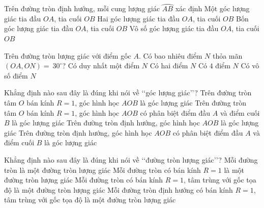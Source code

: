 \begin{ex}%
	Trên đường tròn định hướng, mỗi cung lượng giác  $\wideparen{AB}$ xác định
	\choice 
		{  Một góc lượng giác tia đầu $OA$, tia cuối $OB$}
		{ Hai góc lượng giác tia  đầu $OA$, tia cuối $OB$}
		{ Bốn góc lượng  giác tia đầu $OA$, tia cuối $OB$}
		{\True Vô số góc lượng  giác tia đầu $OA$, tia cuối $OB$}
\end{ex}

\begin{ex}%
	Trên đường tròn lượng giác với điểm gốc $A$. Có bao nhiêu điểm $N$ thỏa mãn $\left(OA, ON\right)=~30^\circ$? 
	 \choice
		{\True Có  duy nhất một điểm $N$}
		{Có hai  điểm $N$}
		{Có $4$ điểm $N$} 
		{Có vô  số điểm $N$}
\end{ex}

\begin{ex}%
	Khẳng định nào sau đây  là đúng khi nói về \lq\lq góc lượng giác\rq\rq?
	\choice 
		{  Trên đường tròn tâm $O$ bán kính $R=1$, góc hình học $AOB$ là góc lượng giác}
		{ Trên đường tròn tâm $O$ bán kính $R=1$, góc hình học $AOB$ có  phân biệt điểm đầu $A$ và điểm cuối $B$ là góc lượng giác}
		{ Trên đường tròn định hướng, góc hình học $AOB$ là góc lượng  giác}
		{\True Trên đường tròn định hướng, góc hình học  $AOB$ có phân biệt điểm đầu $A$ và điểm cuối $B$ là góc lượng giác}
\end{ex}

\begin{ex}%
	Khẳng định nào sau đây là đúng khi  nói về \lq\lq đường tròn lượng giác\rq\rq?
	 \choice
		{ Mỗi đường tròn là một đường tròn lượng  giác}
		{ Mỗi đường tròn có  bán kính $R=1$ là một đường tròn lượng giác}
		{ Mỗi đường tròn có bán kính $R=1$, tâm trùng  với gốc tọa độ là một đường tròn lượng giác}
		{\True Mỗi đường tròn định hướng có bán kính $R=1$,  tâm trùng với gốc tọa độ là một đường tròn lượng giác}
\end{ex}

